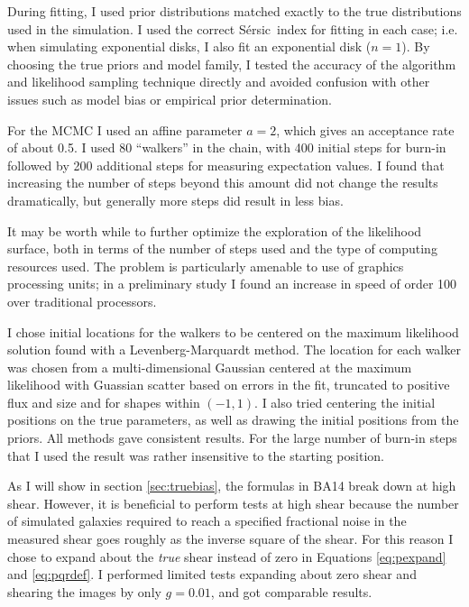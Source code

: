 \documentclass[usegraphicx,usenatbib]{mn2e}
\newcommand{\sersic}{S\'{e}rsic}
\begin{document}
During fitting, I used prior distributions matched exactly to the true
distributions used in the simulation.  I used the correct \sersic\ index for
fitting in each case; i.e. when simulating exponential disks, I also fit an
exponential disk ($n=1$).  By choosing the true priors and model family, I
tested the accuracy of the algorithm and likelihood sampling technique directly
and avoided confusion with other issues such as model bias or empirical prior
determination.

For the MCMC I used an affine parameter $a=2$, which gives an acceptance rate
of about 0.5. I used 80 ``walkers'' in the chain, with 400 initial steps for
burn-in followed by 200 additional steps for measuring expectation values.  I
found that increasing the number of steps beyond this amount did not change
the results dramatically, but generally more steps did result in less bias.

It may be worth while to further optimize the exploration of the likelihood
surface, both in terms of the number of steps used and the type of computing
resources used.  The problem is particularly amenable to use of graphics
processing units; in a preliminary study I found an increase in speed of order
100 over traditional processors.

I chose initial locations for the walkers to be centered on the maximum
likelihood solution found with a Levenberg-Marquardt method. The location for
each walker was chosen from a multi-dimensional Gaussian centered at the
maximum likelihood with Guassian scatter based on errors in the fit, truncated
to positive flux and size and for shapes within $(-1,1)$.  I also tried
centering the initial positions on the true parameters, as well as drawing the
initial positions from the priors.  All methods gave consistent results.  For
the large number of burn-in steps that I used the result was rather insensitive
to the starting position.


As I will show in section \ref{sec:truebias}, the formulas in BA14 break down
at high shear.  However, it is beneficial to perform tests at high shear
because the number of simulated galaxies required to reach a specified
fractional noise in the measured shear goes roughly as the inverse square of
the shear.  For this reason I chose to expand about the {\it true} shear
instead of zero in Equations \ref{eq:pexpand} and \ref{eq:pqrdef}.  I performed
limited tests expanding about zero shear and shearing the images by only $g=0.01$,
and got comparable results. 
\end{document}
